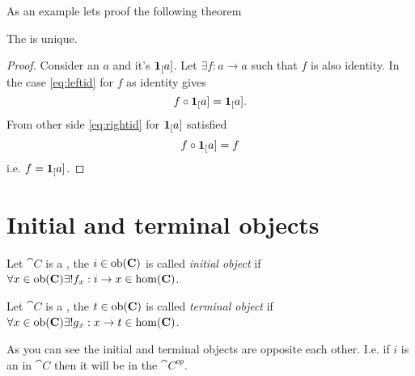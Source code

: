 As an example lets proof the following theorem
\begin{theorem}
\label{thm:identity_unique}
The  is unique.
\begin{proof}
Consider an  $a$ and it's  
$\mathbf{1}_{[}a]$. Let $\exists f: a \to a$ such that $f$ is also
identity. In the case \eqref{eq:leftid} for $f$ as identity gives
\[
f \circ \mathbf{1}_{[}a] = \mathbf{1}_{[}a].
\]
From other side \eqref{eq:rightid} for $\mathbf{1}_{[}a]$ satisfied
\[
f \circ \mathbf{1}_{[}a] = f
\]
i.e. $f = \mathbf{1}_{[}a]$.
\end{proof}
\end{theorem}

\section{Initial and terminal objects}
\begin{definition}
\label{def:initial_object}
Let $\cat{C}$ is a , the
 $i \in \mathrm{ob}(\mathbf{C})$ is called
\textit{initial object} if $\forall x \in \mathrm{ob}(\mathbf{C})
\exists! f_x: i \to x \in \mathrm{hom}(\mathbf{C})$.
\end{definition}

\begin{definition}
\label{def:terminal_object}
Let $\cat{C}$ is a , the
 $t \in \mathrm{ob}(\mathbf{C})$ is called
\textit{terminal object} if $\forall x \in \mathrm{ob}(\mathbf{C})
\exists! g_x: x \to t \in \mathrm{hom}(\mathbf{C})$.
\end{definition}

As you can see the initial and terminal objects are opposite each
other. I.e. if $i$ is an  in $\cat{C}$
then it will be  in
the  $\cat{C^{op}}$.

